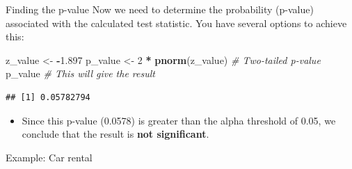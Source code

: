 \documentclass[
  ignorenonframetext,
]{beamer}
\newenvironment{Shaded}{\begin{snugshade}}{\end{snugshade}}
\newcommand{\CommentTok}[1]{\textcolor[rgb]{0.56,0.35,0.01}{\textit{#1}}}
\newcommand{\DecValTok}[1]{\textcolor[rgb]{0.00,0.00,0.81}{#1}}
\newcommand{\FloatTok}[1]{\textcolor[rgb]{0.00,0.00,0.81}{#1}}
\newcommand{\FunctionTok}[1]{\textcolor[rgb]{0.13,0.29,0.53}{\textbf{#1}}}
\newcommand{\NormalTok}[1]{#1}
\newcommand{\OtherTok}[1]{\textcolor[rgb]{0.56,0.35,0.01}{#1}}
\newcommand{\SpecialCharTok}[1]{\textcolor[rgb]{0.81,0.36,0.00}{\textbf{#1}}}
\providecommand{\tightlist}{%
  \setlength{\itemsep}{0pt}\setlength{\parskip}{0pt}}
\begin{document}
\begin{frame}[fragile]{Finding the p-value}
\label{finding-the-p-value}
Now we need to determine the probability (p-value) associated with the
calculated test statistic. You have several options to achieve this:

\begin{Shaded}
\begin{Highlighting}[]
\NormalTok{z\_value }\OtherTok{\textless{}{-}} \SpecialCharTok{{-}}\FloatTok{1.897}
\NormalTok{p\_value }\OtherTok{\textless{}{-}} \DecValTok{2} \SpecialCharTok{*} \FunctionTok{pnorm}\NormalTok{(z\_value)  }\CommentTok{\# Two{-}tailed p{-}value}
\NormalTok{p\_value  }\CommentTok{\# This will give the result}
\end{Highlighting}
\end{Shaded}

\begin{verbatim}
## [1] 0.05782794
\end{verbatim}

\begin{itemize}
\tightlist
\item
  Since this p-value (0.0578) is greater than the alpha threshold of
  0.05, we conclude that the result is \textbf{not significant}.
\end{itemize}
\end{frame}

\begin{frame}{Example: Car rental}
\label{example-car-rental}
\end{frame}
\end{document}

